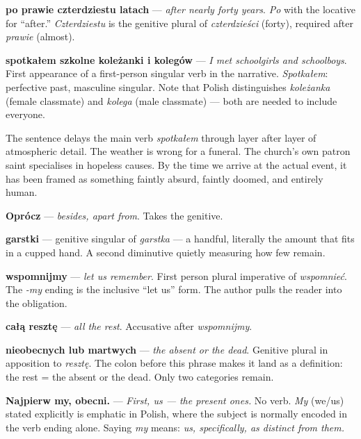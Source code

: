 \textbf{po prawie czterdziestu latach} — \textit{after nearly forty years}. 
\textit{Po} with the locative for ``after.'' \textit{Czterdziestu} is the 
genitive plural of \textit{czterdzieści} (forty), required after \textit{prawie} (almost).

\textbf{spotkałem szkolne koleżanki i kolegów} — \textit{I met schoolgirls 
and schoolboys}. First appearance of a first-person singular verb in the 
narrative. \textit{Spotkałem}: perfective past, masculine singular. Note that 
Polish distinguishes \textit{koleżanka} (female classmate) and \textit{kolega} 
(male classmate) — both are needed to include everyone.

The sentence delays the main verb \textit{spotkałem} through layer after layer 
of atmospheric detail. The weather is wrong for a funeral. The church's own 
patron saint specialises in hopeless causes. By the time we arrive at the actual 
event, it has been framed as something faintly absurd, faintly doomed, and entirely human.




\textbf{Oprócz} — \textit{besides, apart from}. Takes the genitive.

\textbf{garstki} — genitive singular of \textit{garstka} — a handful, literally 
the amount that fits in a cupped hand. A second diminutive quietly measuring 
how few remain.

\textbf{wspomnijmy} — \textit{let us remember}. First person plural imperative 
of \textit{wspomnieć}. The \textit{-my} ending is the inclusive ``let us'' form. 
The author pulls the reader into the obligation.

\textbf{całą resztę} — \textit{all the rest}. Accusative after \textit{wspomnijmy}.

\textbf{nieobecnych lub martwych} — \textit{the absent or the dead}. Genitive 
plural in apposition to \textit{resztę}. The colon before this phrase makes it 
land as a definition: the rest = the absent or the dead. Only two categories remain.

\textbf{Najpierw my, obecni.} — \textit{First, us --- the present ones.} 
No verb. \textit{My} (we/us) stated explicitly is emphatic in Polish, where 
the subject is normally encoded in the verb ending alone. Saying \textit{my} 
means: \textit{us, specifically, as distinct from them.}

